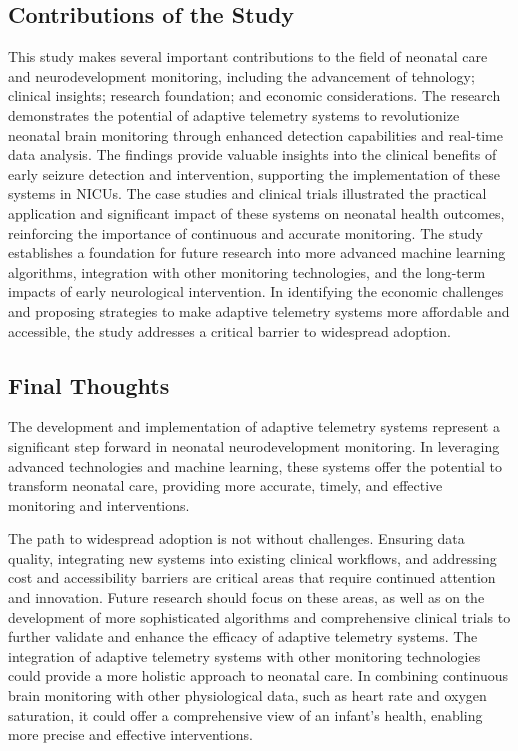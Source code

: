 \documentclass[12pt,journal,compsoc]{IEEEtran}
\begin{document}
\subsection{Contributions of the Study}

This study makes several important contributions to the field of neonatal care and neurodevelopment monitoring, including the advancement of tehnology; clinical insights; research foundation; and economic considerations. The research demonstrates the potential of adaptive telemetry systems to revolutionize neonatal brain monitoring through enhanced detection capabilities and real-time data analysis. The findings provide valuable insights into the clinical benefits of early seizure detection and intervention, supporting the implementation of these systems in NICUs. The case studies and clinical trials illustrated the practical application and significant impact of these systems on neonatal health outcomes, reinforcing the importance of continuous and accurate monitoring. The study establishes a foundation for future research into more advanced machine learning algorithms, integration with other monitoring technologies, and the long-term impacts of early neurological intervention. In identifying the economic challenges and proposing strategies to make adaptive telemetry systems more affordable and accessible, the study addresses a critical barrier to widespread adoption.  

\subsection{Final Thoughts}

The development and implementation of adaptive telemetry systems represent a significant step forward in neonatal neurodevelopment monitoring. In leveraging advanced technologies and machine learning, these systems offer the potential to transform neonatal care, providing more accurate, timely, and effective monitoring and interventions.

The path to widespread adoption is not without challenges. Ensuring data quality, integrating new systems into existing clinical workflows, and addressing cost and accessibility barriers are critical areas that require continued attention and innovation. Future research should focus on these areas, as well as on the development of more sophisticated algorithms and comprehensive clinical trials to further validate and enhance the efficacy of adaptive telemetry systems. The integration of adaptive telemetry systems with other monitoring technologies could provide a more holistic approach to neonatal care. In combining continuous brain monitoring with other physiological data, such as heart rate and oxygen saturation, it could offer a comprehensive view of an infant's health, enabling more precise and effective interventions.
\end{document}
